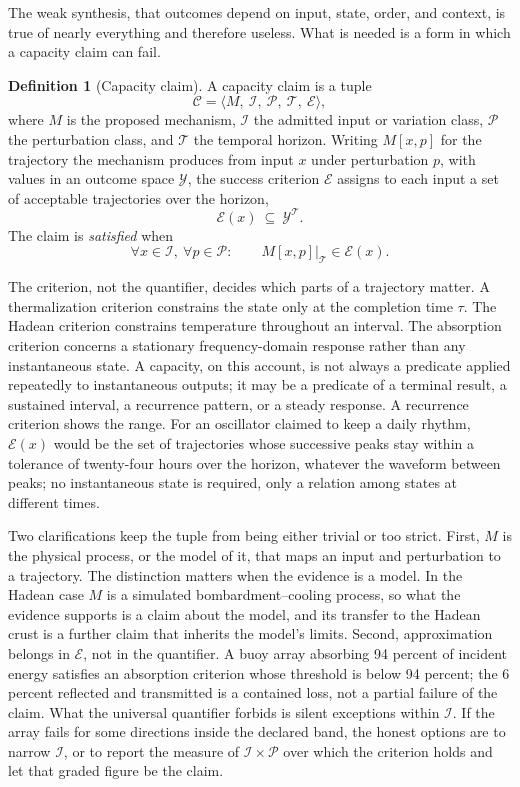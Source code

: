 \documentclass[11pt]{article}
\theoremstyle{definition}
\newtheorem{definition}{Definition}
\newcommand{\Iset}{\mathcal I}
\newcommand{\Pset}{\mathcal P}
\newcommand{\Tset}{\mathcal T}
\newcommand{\Eset}{\mathcal E}
\newcommand{\Cclaim}{\mathcal C}
\begin{document}
The weak synthesis, that outcomes depend on input, state, order, and context, is true of nearly everything and therefore useless. What is needed is a form in which a capacity claim can fail.

\begin{definition}[Capacity claim]
A capacity claim is a tuple
\begin{equation}
\Cclaim=\langle M,\ \Iset,\ \Pset,\ \Tset,\ \Eset\rangle,
\end{equation}
where $M$ is the proposed mechanism, $\Iset$ the admitted input or variation class, $\Pset$ the perturbation class, and $\Tset$ the temporal horizon. Writing $M[x,p]$ for the trajectory the mechanism produces from input $x$ under perturbation $p$, with values in an outcome space $\mathcal Y$, the success criterion $\Eset$ assigns to each input a set of acceptable trajectories over the horizon,
\begin{equation}
\Eset(x)\ \subseteq\ \mathcal Y^{\Tset}.
\end{equation}
The claim is \emph{satisfied} when
\begin{equation}
\forall x\in\Iset,\ \forall p\in\Pset:\qquad M[x,p]\big|_{\Tset}\in\Eset(x).
\end{equation}
\end{definition}

The criterion, not the quantifier, decides which parts of a trajectory matter. A thermalization criterion constrains the state only at the completion time $\tau$. The Hadean criterion constrains temperature throughout an interval. The absorption criterion concerns a stationary frequency-domain response rather than any instantaneous state. A capacity, on this account, is not always a predicate applied repeatedly to instantaneous outputs; it may be a predicate of a terminal result, a sustained interval, a recurrence pattern, or a steady response. A recurrence criterion shows the range. For an oscillator claimed to keep a daily rhythm, $\Eset(x)$ would be the set of trajectories whose successive peaks stay within a tolerance of twenty-four hours over the horizon, whatever the waveform between peaks; no instantaneous state is required, only a relation among states at different times.

Two clarifications keep the tuple from being either trivial or too strict. First, $M$ is the physical process, or the model of it, that maps an input and perturbation to a trajectory. The distinction matters when the evidence is a model. In the Hadean case $M$ is a simulated bombardment--cooling process, so what the evidence supports is a claim about the model, and its transfer to the Hadean crust is a further claim that inherits the model's limits. Second, approximation belongs in $\Eset$, not in the quantifier. A buoy array absorbing 94 percent of incident energy satisfies an absorption criterion whose threshold is below 94 percent; the 6 percent reflected and transmitted is a contained loss, not a partial failure of the claim. What the universal quantifier forbids is silent exceptions within $\Iset$. If the array fails for some directions inside the declared band, the honest options are to narrow $\Iset$, or to report the measure of $\Iset\times\Pset$ over which the criterion holds and let that graded figure be the claim.
\end{document}
